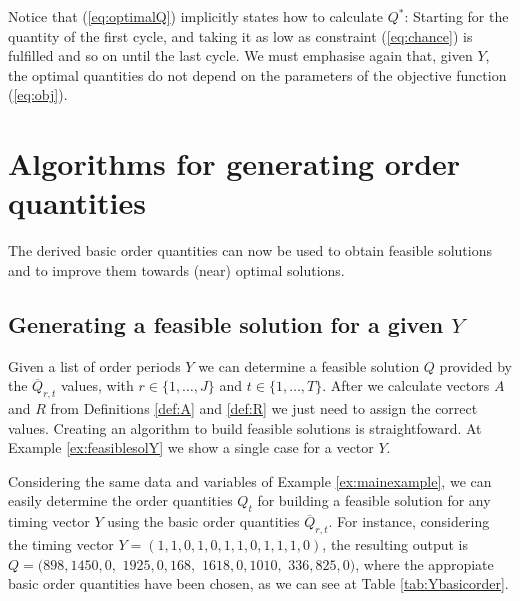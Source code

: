 Notice that (\ref{eq:optimalQ}) implicitly states how to calculate $Q^*$: Starting for the quantity of the first cycle, and taking it as low as constraint (\ref{eq:chance}) is fulfilled and so on until the last cycle. We must emphasise again that, given $Y$, the optimal quantities do not depend on the parameters of the objective function (\ref{eq:obj}).



\section{Algorithms for generating order quantities}
\label{sec:alg}

The derived basic order quantities can now be used to obtain feasible solutions and to improve them towards (near) optimal solutions.

\subsection{Generating a feasible solution for a given $Y$}
Given a list of order periods $Y$ we can determine a feasible solution $Q$ provided by the $\overline{Q}_{r,t}$ values, with $r\in\{1,\ldots,J\}$ and $t\in \{1,\ldots,T\}$.
 After we calculate vectors $A$ and $R$ from Definitions \ref{def:A} and \ref{def:R} we just need to assign the correct values.  Creating an algorithm to build feasible solutions is straightfoward. At Example \ref{ex:feasiblesolY} we show a single case for a vector $Y$.


\begin{example}
\label{ex:feasiblesolY}
Considering the same data and variables of Example \ref{ex:mainexample}, we can easily determine the order  quantities $Q_t$ for building a feasible solution for any timing vector $Y$ using the basic order quantities $\overline Q_{r,t}$. For instance, considering the timing vector $Y=(1,1,0,1,0,1,1,0,1,1,1,0)$, the resulting output is  $Q=(898,1450,0,$ $1925,0,168,$ $1618,0,1010,$ $336,825,0)$, where the appropiate basic order quantities have been chosen, as we can see at Table \ref{tab:Ybasicorder}.
\end{example}


